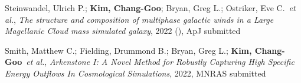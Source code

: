 \item Steinwandel, Ulrich P.; \textbf{Kim, Chang-Goo}; Bryan, Greg L.; Ostriker, Eve C.~\textit{et al.}, \textit{The structure and composition of multiphase galactic winds in a Large Magellanic Cloud mass simulated galaxy}, 2022 (), ApJ submitted
\item Smith, Matthew C.; Fielding, Drummond B.; Bryan, Greg L.; \textbf{Kim, Chang-Goo}~\textit{et al.}, \textit{Arkenstone I: A Novel Method for Robustly Capturing High Specific Energy Outflows In Cosmological Simulations}, 2022, MNRAS submitted

